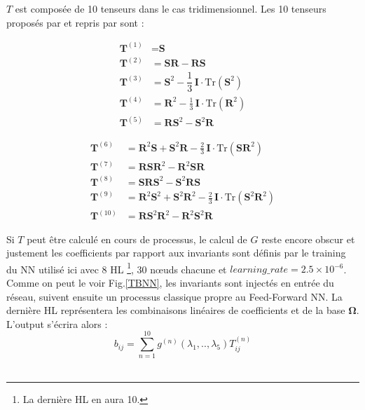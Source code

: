 \documentclass[a4paper,12pt]{report}
\numberwithin{equation}{section} %
\begin{document}
\noindent $T$ est composée de 10 tenseurs dans le cas tridimensionnel. Les 10 tenseurs proposés par \cite{pope1975more} et repris par \cite{ling2016reynolds} sont : \setlength{\columnseprule}{0pt}
\\
\vspace{-6mm}
\begin{multicols}{2}

\begin{align*}
\textbf{T}^{(1)} &= \textbf{S} \\
\textbf{T}^{(2)} &= \textbf{S}\textbf{R} - \textbf{R}\textbf{S} \\
\textbf{T}^{(3)} &= \textbf{S}^2 - \dfrac{1}{3}\, \textbf{I} \cdot \text{Tr} \left( \textbf{S}^2 \right)\\
\textbf{T}^{(4)} &= \textbf{R}^2 - \frac{1}{3}\, \textbf{I} \cdot \text{Tr} \left( \textbf{R}^2 \right)\\
\textbf{T}^{(5)} &= \textbf{R}\textbf{S}^2 - \textbf{S}^2\textbf{R}
\end{align*}

\columnbreak

\begin{align*}
\textbf{T}^{(6)} &= \textbf{R}^2\textbf{S} + \textbf{S}^2\textbf{R} - \frac{2}{3}\, \textbf{I}\cdot \text{Tr}\left(\textbf{S}\textbf{R}^2 \right) \\
\textbf{T}^{(7)} &= \textbf{R}\textbf{S}\textbf{R}^2 - \textbf{R}^2\textbf{S}\textbf{R} \\
\textbf{T}^{(8)} &= \textbf{S}\textbf{R}\textbf{S}^2 - \textbf{S}^2\textbf{R}\textbf{S} \\
\textbf{T}^{(9)} &= \textbf{R}^2\textbf{S}^2 + \textbf{S}^2\textbf{R}^2 - \frac{2}{3}\, \textbf{I}\cdot \text{Tr}\left(\textbf{S}^2\textbf{R}^2 \right)\\
\textbf{T}^{(10)} &= \textbf{R}\textbf{S}^2\textbf{R}^2 - \textbf{R}^2\textbf{S}^2\textbf{R}
\end{align*}

\end{multicols}

\noindent Si $T$ peut être calculé en cours de processus, le calcul de $G$ reste encore obscur et justement les coefficients par rapport aux invariants sont définis par le training du NN utilisé ici avec 8 HL \footnote{La dernière HL en aura 10.}, 30 nœuds chacune et $learning\_rate = 2.5 \times 10^{-6}$. \\

Comme on peut le voir Fig.\eqref{TBNN}, les invariants sont injectés en entrée du réseau, suivent ensuite un processus classique propre au Feed-Forward NN. La dernière HL représentera les combinaisons linéaires de coefficients et de la base $\mathbf{\Omega}$. \\
L'output s'écrira alors : $$ b_{ij} = \sum_{n=1}^{10} g^{(n)}(\lambda_1,..,\lambda_5) T_{ij}^{(n)}$$ \\
\end{document}
